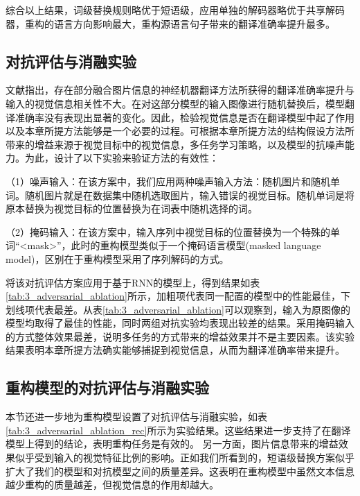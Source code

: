 综合以上结果，词级替换规则略优于短语级，应用单独的解码器略优于共享解码器，重构的语言方向影响最大，重构源语言句子带来的翻译准确率提升最多。

\subsection{对抗评估与消融实验}
\label{sec:3_adversarial_ablation}

文献\cite{23_elliott-2018-adversarial}指出，存在部分融合图片信息的神经机器翻译方法所获得的翻译准确率提升与输入的视觉信息相关性不大。在对这部分模型的输入图像进行随机替换后，模型翻译准确率没有表现出显著的变化。因此，检验视觉信息是否在翻译模型中起了作用以及本章所提方法能够是一个必要的过程。可根据本章所提方法的结构假设方法所带来的增益来源于视觉目标中的视觉信息，多任务学习策略，以及模型的抗噪声能力。为此，设计了以下实验来验证方法的有效性：

（1）{\sffamily 噪声输入：}在该方案中，我们应用两种噪声输入方法：随机图片和随机单词。随机图片就是在数据集中随机选取图片，输入错误的视觉目标。随机单词是将原本替换为视觉目标的位置替换为在词表中随机选择的词。

（2）{\sffamily 掩码输入：}在该方案中，输入序列中视觉目标的位置替换为一个特殊的单词“<mask>”，此时的重构模型类似于一个掩码语言模型(masked language model)，区别在于重构模型采用了序列解码的方式。


将该对抗评估方案应用于基于RNN的模型上，得到结果如表\ref{tab:3_adversarial_ablation}所示，加粗项代表同一配置的模型中的性能最佳，下划线项代表最差。从表\ref{tab:3_adversarial_ablation}可以观察到，输入为原图像的模型均取得了最佳的性能，同时两组对抗实验均表现出较差的结果。采用掩码输入的方式整体效果最差，说明多任务的方式带来的增益效果并不是主要因素。该实验结果表明本章所提方法确实能够捕捉到视觉信息，从而为翻译准确率带来提升。

\subsection{重构模型的对抗评估与消融实验}
\label{sec:3_adversarial_ablation_rec}


本节还进一步地为重构模型设置了对抗评估与消融实验，如表\ref{tab:3_adversarial_ablation_rec}所示为实验结果。这些结果进一步支持了在翻译模型上得到的结论，表明重构任务是有效的。 另一方面，图片信息带来的增益效果似乎受到输入的视觉特征比例的影响。正如我们所看到的，短语级替换方案似乎扩大了我们的模型和对抗模型之间的质量差异。这表明在重构模型中虽然文本信息越少重构的质量越差，但视觉信息的作用却越大。

